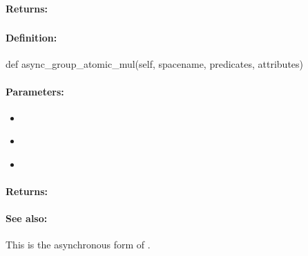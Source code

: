 \paragraph{Returns:}


\pagebreak
\subsubsection{}
\label{api:python:async_group_atomic_mul}


\paragraph{Definition:}
\begin{pythoncode}
def async_group_atomic_mul(self, spacename, predicates, attributes)
\end{pythoncode}

\paragraph{Parameters:}
\begin{itemize}[noitemsep]
\item {}\\

\item {}\\

\item {}\\

\end{itemize}

\paragraph{Returns:}


\paragraph{See also:}  This is the asynchronous form of .

\pagebreak
